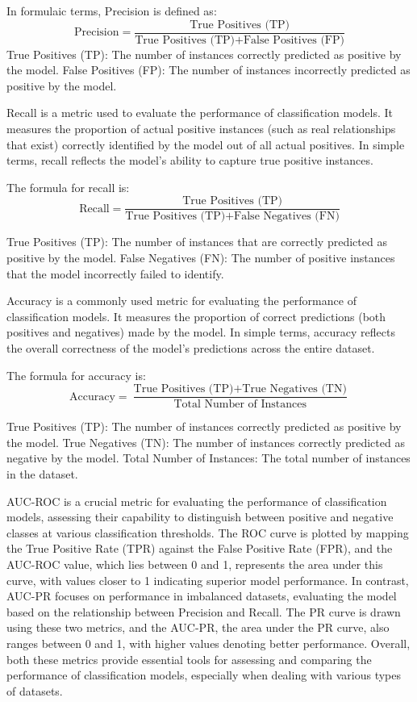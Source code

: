\documentclass[conference]{IEEEtran}
\begin{document}
In formulaic terms, Precision is defined as:
\[\text{Precision} = \frac{\text{True Positives (TP)}}{\text{True Positives (TP)} + \text{False Positives (FP)}}\]
True Positives (TP): The number of instances correctly predicted as positive by the model.
False Positives (FP): The number of instances incorrectly predicted as positive by the model.

Recall is a metric used to evaluate the performance of classification models. It measures the proportion of actual positive instances (such as real relationships that exist) correctly identified by the model out of all actual positives. In simple terms, recall reflects the model's ability to capture true positive instances.\cite{alma992984185801101631}

The formula for recall is: 
\[\text{Recall} = \frac{\text{True Positives (TP)}}{\text{True Positives (TP)} + \text{False Negatives (FN)}}\]

True Positives (TP): The number of instances that are correctly predicted as positive by the model.
False Negatives (FN): The number of positive instances that the model incorrectly failed to identify.

Accuracy is a commonly used metric for evaluating the performance of classification models. It measures the proportion of correct predictions (both positives and negatives) made by the model. In simple terms, accuracy reflects the overall correctness of the model's predictions across the entire dataset.\cite{alma992984185801101631}

The formula for accuracy is:
 \[\text{Accuracy} = \frac{\text{True Positives (TP)} + \text{True Negatives (TN)}}{\text{Total Number of Instances}}\]

True Positives (TP): The number of instances correctly predicted as positive by the model.
True Negatives (TN): The number of instances correctly predicted as negative by the model.
Total Number of Instances: The total number of instances in the dataset.

AUC-ROC is a crucial metric for evaluating the performance of classification models, assessing their capability to distinguish between positive and negative classes at various classification thresholds. The ROC curve is plotted by mapping the True Positive Rate (TPR) against the False Positive Rate (FPR), and the AUC-ROC value, which lies between 0 and 1, represents the area under this curve, with values closer to 1 indicating superior model performance. In contrast, AUC-PR focuses on performance in imbalanced datasets, evaluating the model based on the relationship between Precision and Recall. The PR curve is drawn using these two metrics, and the AUC-PR, the area under the PR curve, also ranges between 0 and 1, with higher values denoting better performance. Overall, both these metrics provide essential tools for assessing and comparing the performance of classification models, especially when dealing with various types of datasets.\cite{alma992984185801101631}
\end{document}
